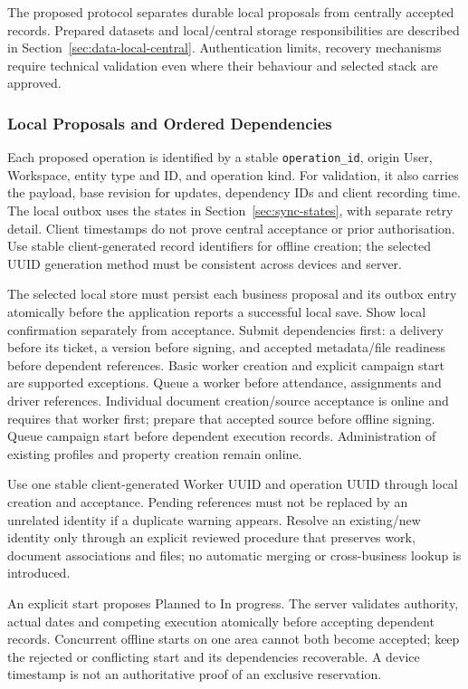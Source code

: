 \label{sec:offline-sync}
\label{sec:offline-synchronisation}
The proposed protocol separates durable local proposals from centrally accepted
records. Prepared datasets and local/central storage responsibilities are described
in Section~\ref{sec:data-local-central}. Authentication limits, recovery mechanisms
require technical validation even where their behaviour and selected stack are approved.


\subsubsection{Local Proposals and Ordered Dependencies}

Each proposed operation is identified by a stable \texttt{operation\_id}, origin
User, Workspace, entity type and ID, and operation kind.
For validation, it also carries the payload, base revision for updates, dependency
IDs and client recording time. The local outbox uses the states in
Section~\ref{sec:sync-states}, with separate retry detail.
Client timestamps do not prove central acceptance or prior authorisation.
Use stable client-generated record identifiers for offline creation; the selected
UUID generation method must be consistent across devices and server.

The selected local store must persist each business proposal and its outbox entry
atomically before the application reports a successful local save. Show local confirmation separately from acceptance.
Submit dependencies first: a delivery before its ticket, a version before signing,
and accepted metadata/file readiness before dependent references. Basic worker creation and explicit campaign start are supported exceptions.
Queue a worker before attendance, assignments and driver references. Individual
document creation/source acceptance is online and requires that worker first;
prepare that accepted source before offline signing. Queue campaign start before dependent
execution records. Administration of existing profiles and property creation remain online.


Use one stable client-generated Worker UUID and operation UUID through local
creation and acceptance. Pending references must not be replaced by an unrelated
identity if a duplicate warning appears. Resolve an existing/new identity only
through an explicit reviewed procedure that preserves work, document associations
and files; no automatic merging or cross-business lookup is introduced.

An explicit start proposes Planned to In progress. The server validates authority,
actual dates and competing execution atomically before accepting dependent records.
Concurrent offline starts on one area cannot both become accepted; keep the rejected
or conflicting start and its dependencies recoverable. A device timestamp is not
an authoritative proof of an exclusive reservation.


